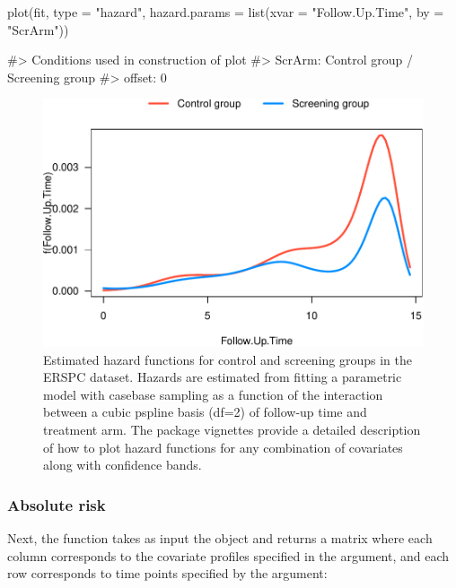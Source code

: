 \begin{Schunk}
\begin{Sinput}
plot(fit, type = "hazard",
     hazard.params = list(xvar = "Follow.Up.Time",
                          by = "ScrArm"))
\end{Sinput}
\begin{Soutput}
#> Conditions used in construction of plot
#> ScrArm: Control group / Screening group
#> offset: 0
\end{Soutput}
\begin{figure}[ht]
\includegraphics[width=\textwidth,keepaspectratio=true]{./cs1hazard-1} \caption[Estimated hazard functions for control and screening groups in the ERSPC dataset]{Estimated hazard functions for control and screening groups in the ERSPC dataset. Hazards are estimated from fitting a parametric model with casebase sampling as a function of the interaction between a cubic pspline basis (df=2) of follow-up time and treatment arm. The package vignettes provide a detailed description of how to plot hazard functions for any combination of covariates along with confidence bands.}\label{fig:cs1hazard}
\end{figure}
\end{Schunk}

\FloatBarrier

\hypertarget{absolute-risk}{%
\subsubsection{Absolute risk}\label{absolute-risk}}

Next, the  function takes as input the
 object and returns a matrix where each column
corresponds to the covariate profiles specified in the 
argument, and each row corresponds to time points specified by the
 argument:


